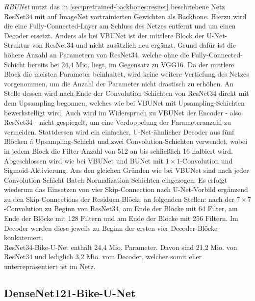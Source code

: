 \textit{\ac{RBUNet}} nutzt das in \autoref{sec:pretrained-backbones:resnet} beschriebene Netz ResNet34 
mit auf ImageNet vortrainierten Gewichten als Backbone. 
Hierzu wird die eine Fully-Connected-Layer am Schluss des Netzes entfernt und um einen Decoder ersetzt. 
Anders als bei \ac{VBUNet} ist der mittlere Block der U-Net-Struktur von ResNet34 
und nicht zusätzlich neu ergänzt. Grund dafür ist die höhere Anzahl an Parametern 
von ResNet34, welche ohne die Fully-Connected-Schicht bereits bei 24,4 Mio. liegt, im Gegensatz zu VGG16. 
Da der mittlere Block die meisten Parameter beinhaltet, wird keine weitere Vertiefung des Netzes vorgenommen,
um die Anzahl der Parameter nicht drastisch zu erhöhen. An Stelle dessen wird nach Ende der Convolution-Schichten von 
ResNet34 direkt mit dem Upsampling begonnen, welches wie bei \ac{VBUNet} mit Upsampling-Schichten 
bewerkstelligt wird. Auch wird im Widerspruch zu \ac{VBUNet} der Encoder - also ResNet34 - nicht gespiegelt, 
um eine Verdoppelung der Parameteranzahl zu vermeiden. Stattdessen wird ein einfacher, U-Net-ähnlicher Decoder
aus fünf Blöcken á Upsampling-Schicht und zwei Convolution-Schichten verwendet, wobei in jedem Block 
die Filter-Anzahl von 512 an bis schließlich 16 halbiert wird. Abgeschlossen wird wie bei \ac{VBUNet} und
\ac{BUNet} mit $1\times 1$-Convolution und Sigmoid-Aktivierung. Aus den gleichen Gründen wie bei \ac{VBUNet}
sind nach jeder Convolution-Schicht Batch-Normalization-Schichten eingezogen. 
Es erfolgt wiederum das Einsetzen von vier Skip-Connection nach U-Net-Vorbild ergänzend zu den 
Skip-Connections der Residuen-Blöcke an folgenden Stellen: 
nach der $7\times 7$-Convolution zu Beginn von ResNet34, 
am Ende der Blöcke mit 64 Filter, am Ende der Blöcke mit 128 Filtern 
und am Ende der Blöcke mit 256 Filtern. Im Decoder werden diese jeweils 
zu Beginn der ersten vier Decoder-Blöcke konkateniert. \\ 
ResNet34-Bike-U-Net enthält 24,4 Mio. Parameter. Davon sind 21,2 Mio. von ResNet34 und lediglich 3,2 Mio. 
vom Decoder, welcher somit eher unterrepräsentiert ist im Netz.  

\subsection{DenseNet121-Bike-U-Net}

